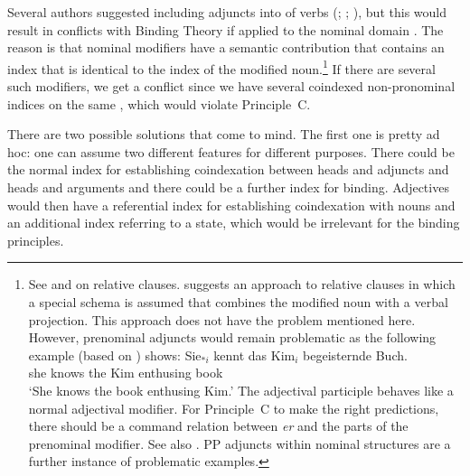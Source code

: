 \documentclass[output=paper
 	        ,biblatex
                ,babelshorthands
                ,newtxmath
                ,draftmode
                ,colorlinks, citecolor=brown
]{langscibook}
\begin{document}
Several authors suggested including adjuncts into \argstls of verbs
(\citealp[]{Chung98}; \citealp[]{Prze99}; \citealp*[]{MSI99a}), but this would
result in conflicts with Binding Theory if applied to the nominal domain \citep[Section~20.4.1.]{Mueller99a}. The reason is that nominal modifiers have a semantic contribution that
contains an index that is identical to the index of the modified noun.\footnote{%
See  and
 on relative clauses. \citet{Sag97a} suggests an approach to relative clauses in
which a special schema is assumed that combines the modified noun with a verbal projection. This
approach does not have the problem mentioned here. However, prenominal adjuncts would remain
problematic as the following example (based on \citealt[]{Mueller99a}) shows:
\ea
\gll Sie$_{*i}$ kennt das Kim$_i$ begeisternde Buch.\\
     she        knows the Kim     enthusing    book\\
\glt `She knows the book enthusing Kim.'
\z
The adjectival participle behaves like a normal adjectival modifier. For Principle~C to make the
right predictions, there should be a command relation between \emph{er} and the parts of the
prenominal modifier. See also
\crossrefchapterw[\pageref{relative-clauses:fn-page-to-be-read}]{relative-clauses}. PP adjuncts
within nominal structures are a further instance of problematic examples.%
} If there are several such modifiers, we get a conflict since we have several coindexed non-pronominal indices on the same
\argstl, which would violate Principle~C. 

There are two possible solutions that come to mind. The first one is pretty ad
hoc: one can assume two different features for different purposes. There could be the normal index
for establishing coindexation between heads and adjuncts and heads and arguments and there could be
a further index for binding. Adjectives would then have a referential index for establishing
coindexation with nouns and an additional index referring to a state, which would be irrelevant for the
binding principles.
\end{document}
